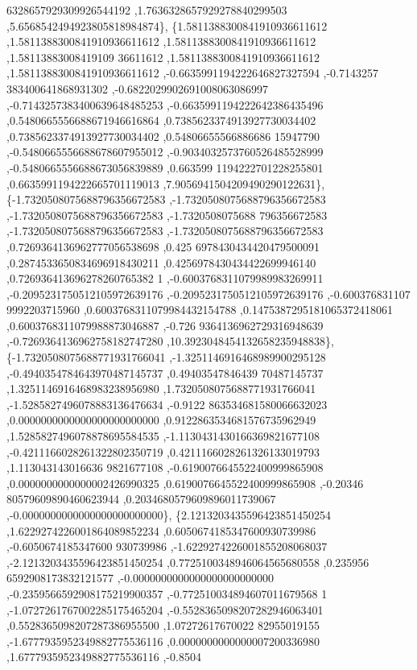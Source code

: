 \begin{DoxyCode}
      6328657929309926544192 ,1.7636328657929278840299503 ,5.6568542494923805818984874\},
\{1.5811388300841910936611612 ,1.5811388300841910936611612 ,1.5811388300841910936611612 ,1.58113883008419109
      36611612 ,1.5811388300841910936611612 ,1.5811388300841910936611612 ,-0.6635991194222646827327594 ,-0.7143257
      383400641868931302 ,-0.6822029902691008063086997 ,-0.7143257383400639648485253 ,-0.6635991194222642386435496
       ,0.5480665556688671946616864 ,0.7385623374913927730034402 ,0.7385623374913927730034402 ,0.54806655566886686
      15947790 ,-0.5480665556688678607955012 ,-0.9034032573760526485528999 ,-0.5480665556688673056839889 ,0.663599
      1194222701228255801 ,0.6635991194222665701119013 ,7.9056941504209490290122631\},
\{-1.7320508075688796356672583 ,-1.7320508075688796356672583 ,-1.7320508075688796356672583 ,-1.7320508075688
      796356672583 ,-1.7320508075688796356672583 ,-1.7320508075688796356672583 ,0.7269364136962777056538698 ,0.425
      6978430434420479500091 ,0.2874533650834696918430211 ,0.4256978430434422699946140 ,0.726936413696278260765382
      1 ,-0.6003768311079989983269911 ,-0.2095231750512105972639176 ,-0.2095231750512105972639176 ,-0.600376831107
      9992203715960 ,0.6003768311079984432154788 ,0.1475387295181065372418061 ,0.6003768311079988873046887 ,-0.726
      9364136962729316948639 ,-0.7269364136962758182747280 ,10.3923048454132658235948838\},
\{-1.7320508075688771931766041 ,-1.3251146916468989900295128 ,-0.4940354784643970487145737 ,0.49403547846439
      70487145737 ,1.3251146916468983238956980 ,1.7320508075688771931766041 ,-1.5285827496078883136476634 ,-0.9122
      863534681580066632023 ,0.0000000000000000000000000 ,0.9122863534681576735962949 ,1.5285827496078878695584535
       ,-1.1130431430166369821677108 ,-0.4211166028261322802350719 ,0.4211166028261326133019793 ,1.113043143016636
      9821677108 ,-0.6190076645522400999865908 ,0.0000000000000002426990325 ,0.6190076645522400999865908 ,-0.20346
      80579609890460623944 ,0.2034680579609896011739067 ,-0.0000000000000000000000000\},
\{2.1213203435596423851450254 ,1.6229274226001864089852234 ,0.6050674185347600930739986 ,-0.6050674185347600
      930739986 ,-1.6229274226001855208068037 ,-2.1213203435596423851450254 ,0.7725100348946064565680558 ,0.235956
      6592908173832121577 ,-0.0000000000000000000000000 ,-0.2359566592908175219900357 ,-0.772510034894607011679568
      1 ,-1.0727261767002285175465204 ,-0.5528365098207282946063401 ,0.5528365098207287386955500 ,1.07272617670022
      82955019155 ,-1.6777935952349882775536116 ,0.0000000000000007200336980 ,1.6777935952349882775536116 ,-0.8504

\end{DoxyCode}
